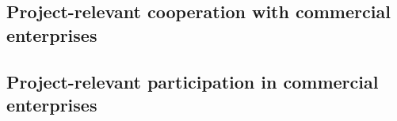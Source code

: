 \documentclass{scrartcl}
\begin{document}

\subsection{Project-relevant cooperation with commercial enterprises}



\subsection{Project-relevant participation in commercial enterprises}
\end{document}
